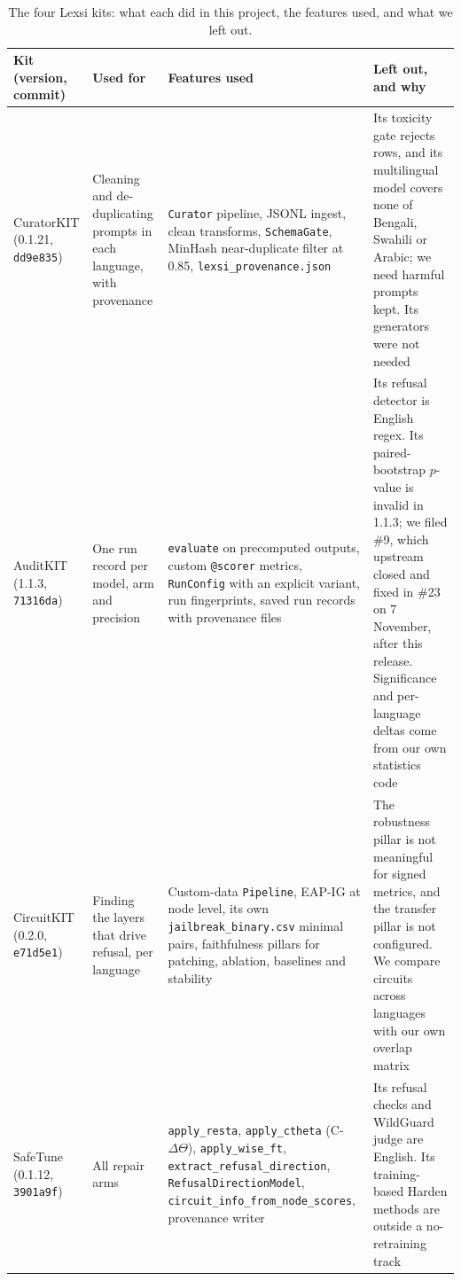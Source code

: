 \documentclass[11pt]{article}
\begin{document}
\begin{table}[t]
\centering\small
\setlength{\tabcolsep}{3pt}
\begin{tabular}{L{2.2cm}L{2.9cm}L{5.1cm}L{4.8cm}}
\toprule
Kit (version, commit) & Used for & Features used & Left out, and why \\
\midrule
CuratorKIT (0.1.21, \texttt{dd9e835}) & Cleaning and de-duplicating prompts in each language, with provenance &
\texttt{Curator} pipeline, JSONL ingest, clean transforms, \texttt{SchemaGate}, MinHash near-duplicate filter at
0.85, \texttt{lexsi\_provenance.json} & Its toxicity gate rejects rows, and its multilingual model covers none of
Bengali, Swahili or Arabic; we need harmful prompts kept. Its generators were not needed \\
AuditKIT (1.1.3, \texttt{71316da}) & One run record per model, arm and precision & \texttt{evaluate} on precomputed
outputs, custom \texttt{@scorer} metrics, \texttt{RunConfig} with an explicit variant, run fingerprints, saved run
records with provenance files & Its refusal detector is English regex. Its paired-bootstrap $p$-value is invalid in
1.1.3; we filed \#9, which upstream closed and fixed in \#23 on 7 November, after this release. Significance and
per-language deltas come from our own statistics code \\
CircuitKIT (0.2.0, \texttt{e71d5e1}) & Finding the layers that drive refusal, per language & Custom-data
\texttt{Pipeline}, EAP-IG at node level, its own \texttt{jailbreak\_binary.csv} minimal pairs, faithfulness pillars
for patching, ablation, baselines and stability & The robustness pillar is not meaningful for signed metrics, and the
transfer pillar is not configured. We compare circuits across languages with our own overlap matrix \\
SafeTune (0.1.12, \texttt{3901a9f}) & All repair arms & \texttt{apply\_resta}, \texttt{apply\_ctheta}
(C-$\Delta\Theta$), \texttt{apply\_wise\_ft}, \texttt{extract\_refusal\_direction}, \texttt{RefusalDirectionModel},
\texttt{circuit\_info\_from\_node\_scores}, provenance writer & Its refusal checks and WildGuard judge are English.
Its training-based Harden methods are outside a no-retraining track \\
\bottomrule
\end{tabular}
\caption{The four Lexsi kits: what each did in this project, the features used, and what we left out.}
\label{tab:kits}
\end{table}
\end{document}
